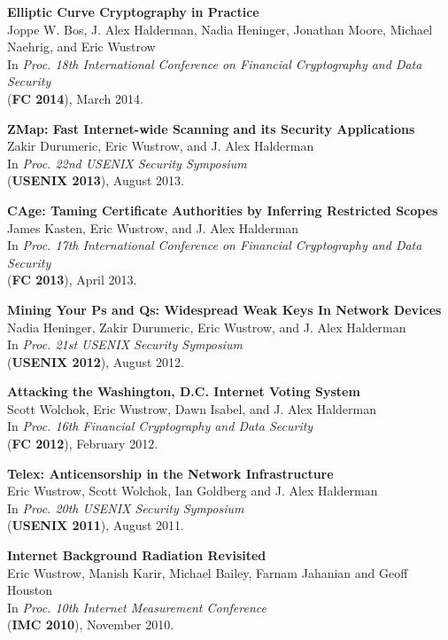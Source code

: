 \documentclass{res}
\begin{document}
\begin{resume}
    \textbf{Elliptic Curve Cryptography in Practice} \\
    Joppe W. Bos, J. Alex Halderman, Nadia Heninger, Jonathan Moore, Michael Naehrig, and Eric Wustrow \\
    In \emph{Proc. 18th International Conference on Financial Cryptography and Data Security} \\
    (\textbf{FC 2014}), March 2014.

    \textbf{ZMap: Fast Internet-wide Scanning and its Security Applications} \\
    Zakir Durumeric, Eric Wustrow, and J. Alex Halderman \\
    In \emph{Proc. 22nd USENIX Security Symposium} \\
    (\textbf{USENIX 2013}), August 2013.

    \textbf{CAge: Taming Certificate Authorities by Inferring Restricted Scopes} \\
    James Kasten, Eric Wustrow, and J. Alex Halderman \\
    In \emph{Proc. 17th International Conference on Financial Cryptography and Data Security} \\
    (\textbf{FC 2013}), April 2013.

    \textbf{Mining Your Ps and Qs: Widespread Weak Keys In Network Devices} \\
    Nadia Heninger, Zakir Durumeric, Eric Wustrow, and J. Alex Halderman \\
    In \emph{Proc. 21st USENIX Security Symposium} \\
    (\textbf{USENIX 2012}), August 2012.

    \textbf{Attacking the Washington, D.C. Internet Voting System} \\
    Scott Wolchok, Eric Wustrow, Dawn Isabel, and J. Alex Halderman \\
    In \emph{Proc. 16th Financial Cryptography and Data Security} \\
    (\textbf{FC 2012}), February 2012.

    \textbf{Telex: Anticensorship in the Network Infrastructure} \\
    Eric Wustrow, Scott Wolchok, Ian Goldberg and J. Alex Halderman \\
    In \emph{Proc. 20th USENIX Security Symposium} \\
    (\textbf{USENIX 2011}), August 2011.

	\textbf{Internet Background Radiation Revisited} \\
	Eric Wustrow, Manish Karir, Michael Bailey, Farnam Jahanian and Geoff Houston \\
	In \emph{Proc. 10th Internet Measurement Conference} \\
	(\textbf{IMC 2010}), November 2010.


\end{resume}
\end{document}

